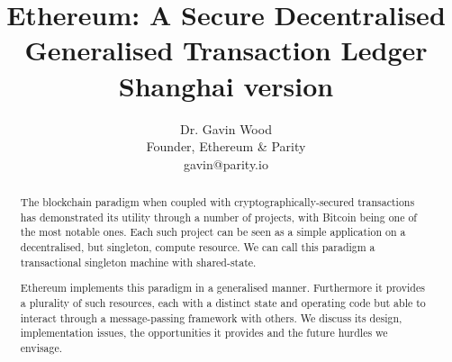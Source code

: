 \documentclass[9pt,oneside]{amsart}
\title[Ethereum: A Secure Decentralised Generalised Transaction Ledger\\ \smaller \textbf{{Shanghai version}}]{Ethereum: A Secure Decentralised Generalised Transaction Ledger \\ \smaller \textbf{{Shanghai version \YellowPaperVersionNumber}}}
\author{
    Dr. Gavin Wood\\
    Founder, Ethereum \& Parity\\
    gavin@parity.io
}
\begin{document}
\pagecolor{pagecolor}

\begin{abstract}
The blockchain paradigm when coupled with cryptographically-secured transactions has demonstrated its utility through a number of projects, with Bitcoin being one of the most notable ones. Each such project can be seen as a simple application on a decentralised, but singleton, compute resource. We can call this paradigm a transactional singleton machine with shared-state.

Ethereum implements this paradigm in a generalised manner. Furthermore it provides a plurality of such resources, each with a distinct state and operating code but able to interact through a message-passing framework with others. We discuss its design, implementation issues, the opportunities it provides and the future hurdles we envisage.
\end{abstract}

\maketitle
\end{document}
